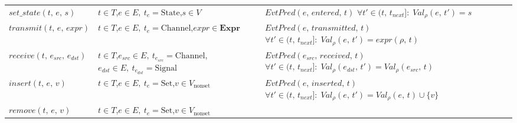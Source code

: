\begin{tabularx}{\textwidth}{lXX}
    $\mathit{set\_state}(t,\, e,\, s)$
                       & $t \in T$,\newline $e \in E,\ t_e = \text{State}$,\newline $s \in V$
                       & $\mathit{EvtPred}(e,\, \mathit{entered},\, t)$ \newline $\forall t' \in (t,\, t_{\mathit{next}}]:\; \mathit{Val}_\rho(e,\, t') = s$                                                                                                \\[4pt]
    $\mathit{transmit}(t,\, e,\, \mathit{expr})$
                       & $t \in T$,\newline $e \in E,\ t_e = \text{Channel}$,\newline $\mathit{expr} \in \mathbf{Expr}$
                       & $\mathit{EvtPred}(e,\, \mathit{transmitted},\, t)$ \newline $\forall t' \in (t,\, t_{\mathit{next}}]:\; \mathit{Val}_\rho(e,\, t') = \mathit{expr}(\rho,\, t)$                                                                     \\[4pt]
    $\mathit{receive}(t,\, e_{\mathit{src}},\, e_{\mathit{dst}})$
                       & $t \in T$,\newline $e_{\mathit{src}} \in E,\ t_{e_{\mathit{src}}} = \text{Channel}$,\newline $e_{\mathit{dst}} \in E,\ t_{e_{\mathit{dst}}} = \text{Signal}$
                       & $\mathit{EvtPred}(e_{\mathit{src}},\, \mathit{received},\, t)$ \newline $\forall t' \in (t,\, t_{\mathit{next}}]:\; \mathit{Val}_\rho(e_{\mathit{dst}},\, t') = \mathit{Val}_\rho(e_{\mathit{src}},\, t)$                                                                      \\[4pt]
    $\mathit{insert}(t,\, e,\, v)$
                       & $t \in T$,\newline $e \in E,\ t_e = \text{Set}$,\newline $v \in V_{\text{nonset}}$
                       & $\mathit{EvtPred}(e,\, \mathit{inserted},\, t)$ \newline $\forall t' \in (t,\, t_{\mathit{next}}]:\; \mathit{Val}_\rho(e,\, t') = \mathit{Val}_\rho(e,\, t) \cup \{v\}$                                                      \\[4pt]
    $\mathit{remove}(t,\, e,\, v)$
                       & $t \in T$,\newline $e \in E,\ t_e = \text{Set}$,\newline $v \in V_{\text{nonset}}$

\end{tabularx}
